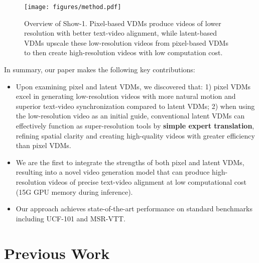 \documentclass{article} \usepackage{iclr2024_conference,times}
\begin{document}
\begin{figure}[t]
    \centering
    \texttt{[image: figures/method.pdf]}
    \caption{Overview of Show-1. Pixel-based VDMs produce videos of lower resolution with better text-video alignment, while latent-based VDMs upscale these low-resolution videos from pixel-based VDMs to then create high-resolution videos with low computation cost.}
    \label{fig:architecture}
\end{figure}










In summary, our paper makes the following key contributions:

\begin{itemize}
    \item Upon examining pixel and latent VDMs, we discovered that: 1) pixel VDMs excel in generating low-resolution videos with more natural motion and superior text-video synchronization compared to latent VDMs; 2) when using the low-resolution video as an initial guide, conventional latent VDMs can effectively function as super-resolution tools by \textbf{simple expert translation}, refining spatial clarity and creating high-quality videos with greater efficiency than pixel VDMs.
   
    \item We are the first to integrate the strengths of both pixel and latent VDMs, resulting into a novel video generation model that can produce high-resolution videos of precise text-video alignment at low computational cost (15G GPU memory during inference).

    \item Our approach achieves state-of-the-art performance on standard benchmarks including UCF-101 and MSR-VTT. 




\end{itemize}


\section{Previous Work}
\end{document}
